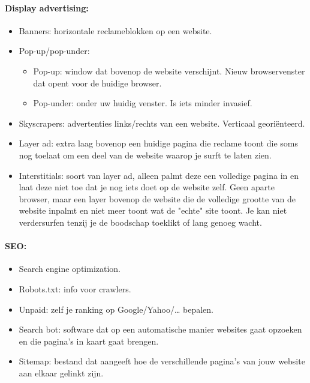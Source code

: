 \documentclass[10pt,a4paper]{report}
\begin{document}
\paragraph{Display advertising:}
\begin{itemize}
\item Banners: horizontale reclameblokken op een website.
\item Pop-up/pop-under:
\begin{itemize}
\item Pop-up: window dat bovenop de website verschijnt. Nieuw browservenster dat opent voor de huidige browser. 
\item Pop-under: onder uw huidig venster. Is iets minder invasief.
\end{itemize}
\item Skyscrapers: advertenties links/rechts van een website. Verticaal georiënteerd.
\item Layer ad: extra laag bovenop een huidige pagina die reclame toont die soms nog toelaat om een deel van de website waarop je surft te laten zien.
\item Interstitials: soort van layer ad, alleen palmt deze een volledige pagina in en laat deze niet toe dat je nog iets doet op de website zelf. Geen aparte browser, maar een layer bovenop de website die de volledige grootte van de website inpalmt en niet meer toont wat de "echte" site toont. Je kan niet verdersurfen tenzij je de boodschap toeklikt of lang genoeg wacht.
\end{itemize}

\paragraph{SEO:}
\begin{itemize}
\item Search engine optimization.
\item Robots.txt: info voor crawlers.
\item Unpaid: zelf je ranking op Google/Yahoo/… bepalen.
\item Search bot: software dat op een automatische manier websites gaat opzoeken en die pagina's in kaart gaat brengen.
\item Sitemap: bestand dat aangeeft hoe de verschillende pagina's van jouw website aan elkaar gelinkt zijn.
\end{itemize}
\end{document}
